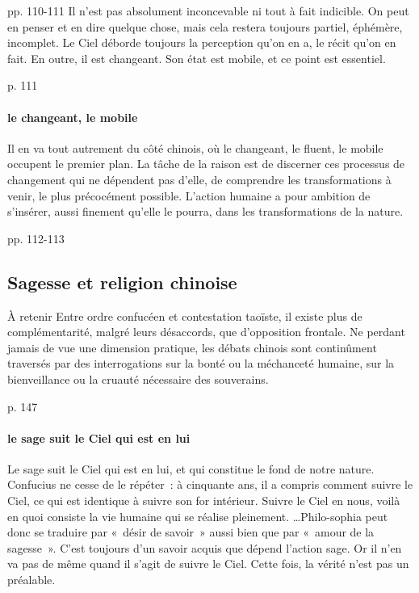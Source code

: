 \cite{PolDroit:voyage} pp. 110-111 
Il n’est pas absolument inconcevable ni tout à fait indicible. On peut en penser
et en dire quelque chose, mais cela restera toujours partiel, éphémère, incomplet. Le Ciel déborde toujours la perception qu’on en a, le récit qu’on en fait. En outre, il est changeant. Son état est mobile, et ce point est essentiel.

\cite{PolDroit:voyage} p. 111 

\paragraph{le changeant, le mobile} Il en va tout autrement du côté chinois, où le changeant, le fluent, le mobile occupent le premier plan. La tâche de la raison est de discerner ces processus de changement qui ne dépendent pas d’elle, de comprendre les transformations à venir, le plus précocément possible. L’action humaine a pour ambition de s’insérer, aussi finement qu’elle le pourra, dans les transformations de la nature.

\cite{PolDroit:voyage} pp. 112-113 

\subsection{Sagesse et religion chinoise}

\begin{Synthesis}
À retenir Entre ordre confucéen et contestation taoïste, il existe plus de complémentarité, malgré leurs désaccords, que d’opposition frontale. Ne perdant jamais de vue une dimension pratique, les débats chinois sont continûment traversés par des interrogations sur la bonté ou la méchanceté humaine, sur la bienveillance ou la cruauté nécessaire des souverains.

\cite{PolDroit:voyage} p. 147 
\end{Synthesis}

\paragraph{le sage suit le Ciel qui est en lui} Le sage suit le Ciel qui est en lui, et qui constitue le fond de notre nature. Confucius ne cesse de le répéter : à cinquante ans, il a compris comment suivre le Ciel, ce qui est identique à suivre son for intérieur. Suivre le Ciel en nous, voilà en quoi consiste la vie humaine qui se réalise pleinement.
\ldots Philo-sophia peut donc se traduire par « désir de savoir » aussi bien que par « amour de la sagesse ». C’est toujours d’un savoir acquis que dépend l’action sage. Or il n’en va pas de même quand il s’agit de suivre le Ciel. Cette fois, la vérité n’est pas un préalable.

